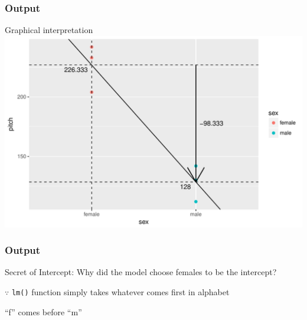 \documentclass[10p]{beamer}\usepackage[]{graphicx}\usepackage[]{color}
\makeatletter
\def\maxwidth{ %
  \ifdim\Gin@nat@width>\linewidth
    \linewidth
  \else
    \Gin@nat@width
  \fi
}
\newenvironment{knitrout}{}{} %
\makeatother
\begin{document}
\begin{frame}[fragile]
\frametitle{Output}
Graphical interpretation
\begin{knitrout}
\color{fgcolor}
\includegraphics[width=\maxwidth]{figure/unnamed-chunk-10-1} 

\end{knitrout}
\end{frame}
\begin{frame}
\frametitle{Output}
Secret of Intercept: Why did the model choose females to be the intercept?
\pause

\vspace{9pt}
$\because$ \texttt{lm()} function simply takes whatever comes first in \alert{alphabet} 

``f'' comes before ``m''

\end{frame}
\end{document}
